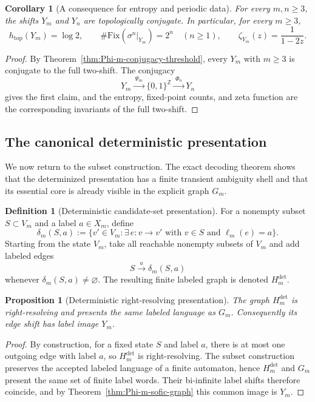 \documentclass[11pt,letterpaper]{article}
\numberwithin{equation}{section}
\theoremstyle{plain}
\newtheorem{proposition}[theorem]{Proposition}
\newtheorem{corollary}[theorem]{Corollary}
\theoremstyle{definition}
\newtheorem{definition}[theorem]{Definition}
\theoremstyle{remark}
\newcommand{\ZZ}{\mathbb{Z}}
\begin{document}
\begin{corollary}[A consequence for entropy and periodic data]
\label{cor:Y-m-conjugacy-collapse}
For every $m,n\ge 3$, the shifts $Y_m$ and $Y_n$ are topologically conjugate.
In particular, for every $m\ge 3$,
\[
h_{\mathrm{top}}(Y_m)=\log 2,
\qquad
\#\mathrm{Fix}(\sigma^n|_{Y_m})=2^n
\quad (n\ge 1),
\qquad
\zeta_{Y_m}(z)=\frac{1}{1-2z}.
\]
\end{corollary}

\begin{proof}
By Theorem~\ref{thm:Phi-m-conjugacy-threshold}, every $Y_m$ with $m\ge 3$ is
conjugate to the full two-shift.  The conjugacy
\[
Y_m\xrightarrow{\ \Psi_m\ }\{0,1\}^{\ZZ}\xrightarrow{\ \Phi_n\ }Y_n
\]
gives the first claim, and the entropy, fixed-point counts, and zeta function
are the corresponding invariants of the full two-shift.
\end{proof}

\subsection{The canonical deterministic presentation}

We now return to the subset construction.  The exact decoding theorem shows
that the determinized presentation has a finite transient ambiguity shell and
that its essential core is already visible in the explicit graph $G_m$.

\begin{definition}[Deterministic candidate-set presentation]
\label{def:Phi-m-right-resolving}
For a nonempty subset $S\subset V_m$ and a label $a\in X_m$, define
\[
\delta_m(S,a):=
\{v'\in V_m:\exists\, e:v\to v' \text{ with } v\in S \text{ and } \ell_m(e)=a\}.
\]
Starting from the state $V_m$, take all reachable nonempty subsets of $V_m$ and
add labeled edges
\[
S\xrightarrow{a}\delta_m(S,a)
\]
whenever $\delta_m(S,a)\neq \varnothing$.  The resulting finite labeled graph
is denoted $H_m^{\mathrm{det}}$.
\end{definition}

\begin{proposition}[Deterministic right-resolving presentation]
\label{prop:Phi-m-right-resolving}
The graph $H_m^{\mathrm{det}}$ is right-resolving and presents the same labeled
language as $G_m$.  Consequently its edge shift has label image $Y_m$.
\end{proposition}

\begin{proof}
By construction, for a fixed state $S$ and label $a$, there is at most one
outgoing edge with label $a$, so $H_m^{\mathrm{det}}$ is right-resolving.  The
subset construction preserves the accepted labeled language of a finite
automaton, hence $H_m^{\mathrm{det}}$ and $G_m$ present the same set of finite
label words.  Their bi-infinite label shifts therefore coincide, and by
Theorem~\ref{thm:Phi-m-sofic-graph} this common image is $Y_m$.
\end{proof}
\end{document}
